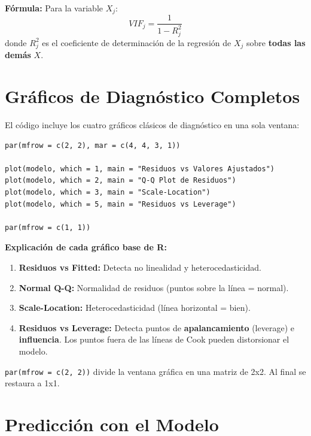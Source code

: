 \documentclass[12pt,a4paper]{article}
\begin{document}
\textbf{Fórmula:} Para la variable $X_j$:
\[
VIF_j = \frac{1}{1 - R_j^2}
\]
donde $R_j^2$ es el coeficiente de determinación de la regresión de $X_j$ sobre \textbf{todas las demás} $X$.

\section{Gráficos de Diagnóstico Completos}

El código incluye los cuatro gráficos clásicos de diagnóstico en una sola ventana:

\begin{lstlisting}[caption={Cuatro gráficos de diagnóstico}]
par(mfrow = c(2, 2), mar = c(4, 4, 3, 1))

plot(modelo, which = 1, main = "Residuos vs Valores Ajustados")
plot(modelo, which = 2, main = "Q-Q Plot de Residuos")
plot(modelo, which = 3, main = "Scale-Location")
plot(modelo, which = 5, main = "Residuos vs Leverage")

par(mfrow = c(1, 1))
\end{lstlisting}

\textbf{Explicación de cada gráfico base de R:}

\begin{enumerate}
    \item \textbf{Residuos vs Fitted:} Detecta no linealidad y heterocedasticidad.
    \item \textbf{Normal Q-Q:} Normalidad de residuos (puntos sobre la línea = normal).
    \item \textbf{Scale-Location:} Heterocedasticidad (línea horizontal = bien).
    \item \textbf{Residuos vs Leverage:} Detecta puntos de \textbf{apalancamiento} (leverage) e \textbf{influencia}. Los puntos fuera de las líneas de Cook pueden distorsionar el modelo.
\end{enumerate}

\texttt{par(mfrow = c(2, 2))} divide la ventana gráfica en una matriz de 2x2. Al final se restaura a 1x1.

\section{Predicción con el Modelo}
\end{document}
